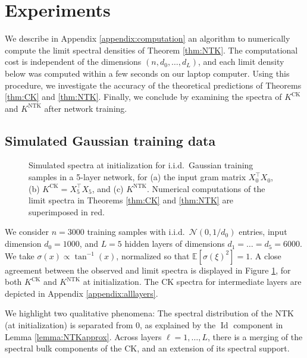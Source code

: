 \documentclass{article}
\theoremstyle{definition}
\newcommand{\N}{\mathcal{N}}
\newcommand{\E}{\mathbb{E}}
\newcommand{\Id}{\operatorname{Id}}
\newcommand{\CK}{\text{CK}}
\newcommand{\NTK}{\text{NTK}}
\newcommand{\1}{\mathbf{1}}
\begin{document}
\section{Experiments}\label{sec:experiments}

We describe in Appendix \ref{appendix:computation} an algorithm to numerically
compute the limit spectral densities of Theorem \ref{thm:NTK}.
The computational cost is independent of the dimensions
$(n,d_0,\ldots,d_L)$, and each limit density below was computed within a few
seconds on our laptop computer. Using this procedure, we investigate
the accuracy of the theoretical predictions of Theorems \ref{thm:CK}
and \ref{thm:NTK}. Finally, we conclude by examining the spectra
of $K^\CK$ and $K^\NTK$ after network training.

\subsection{Simulated Gaussian training data}

\begin{figure}
%
%
\caption{Simulated spectra at initialization
for i.i.d.\ Gaussian training samples in a 5-layer
network, for (a) the input gram matrix $X_0^\top X_0$,
(b) $K^\CK=X_5^\top X_5$, and 
(c) $K^\NTK$. Numerical computations of the limit spectra in
Theorems \ref{thm:CK} and \ref{thm:NTK} are superimposed in red.}
\label{fig:gaussian}
\end{figure}

We consider $n=3000$ training samples with i.i.d.\ $\N(0,1/d_0)$ entries,
input dimension $d_0=1000$, and $L=5$ hidden layers of dimensions
$d_1=\ldots=d_5=6000$. We take $\sigma(x) \propto \tan^{-1}(x)$, normalized
so that $\E[\sigma(\xi)^2]=1$. A close agreement between the observed and limit
spectra is displayed in Figure \ref{fig:gaussian},
for both $K^\CK$ and $K^\NTK$ at initialization. The CK spectra for intermediate layers are depicted in Appendix
\ref{appendix:alllayers}.

We highlight two qualitative phenomena:
The spectral distribution of the NTK (at initialization) is separated from 0, as
explained by the $\Id$ component in Lemma \ref{lemma:NTKapprox}. Across layers $\ell=1,\ldots,L$, there is a merging of the spectral bulk
components of the CK, and an extension of its spectral support.
\end{document}
